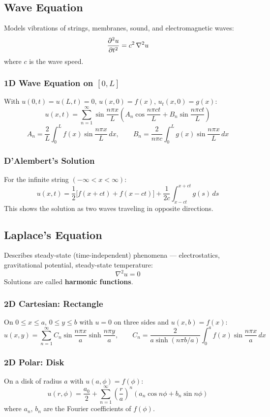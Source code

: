 \documentclass[11pt, letterpaper]{article}
\theoremstyle{plain}
\begin{document}
\subsection{Wave Equation}

Models vibrations of strings, membranes, sound, and electromagnetic waves:
\[
    \pdv[2]{u}{t} = c^2\,\nabla^2 u
\]
where $c$ is the wave speed.

\subsubsection*{1D Wave Equation on $[0,L]$}
With $u(0,t) = u(L,t) = 0$, $u(x,0) = f(x)$, $u_t(x,0) = g(x)$:
\[
    u(x,t) = \sum_{n=1}^{\infty} \sin\frac{n\pi x}{L}
    \left(A_n\cos\frac{n\pi ct}{L} + B_n\sin\frac{n\pi ct}{L}\right)
\]
\[
    A_n = \frac{2}{L}\int_0^L f(x)\sin\frac{n\pi x}{L}\,dx, \qquad
    B_n = \frac{2}{n\pi c}\int_0^L g(x)\sin\frac{n\pi x}{L}\,dx
\]

\subsubsection*{D'Alembert's Solution}
For the infinite string $(-\infty < x < \infty)$:
\[
    u(x,t) = \frac{1}{2}\bigl[f(x+ct) + f(x-ct)\bigr]
            + \frac{1}{2c}\int_{x-ct}^{x+ct} g(s)\,ds
\]
This shows the solution as two waves traveling in opposite directions.


\subsection{Laplace's Equation}

Describes steady-state (time-independent) phenomena — electrostatics,
gravitational potential, steady-state temperature:
\[
    \nabla^2 u = 0
\]
Solutions are called \textbf{harmonic functions}.

\subsubsection*{2D Cartesian: Rectangle}
On $0\leq x\leq a$, $0\leq y\leq b$ with $u=0$ on three sides and
$u(x,b) = f(x)$:
\[
    u(x,y) = \sum_{n=1}^{\infty} C_n \sin\frac{n\pi x}{a}
              \sinh\frac{n\pi y}{a}, \qquad
    C_n = \frac{2}{a\sinh(n\pi b/a)}\int_0^a f(x)\sin\frac{n\pi x}{a}\,dx
\]

\subsubsection*{2D Polar: Disk}
On a disk of radius $a$ with $u(a,\phi) = f(\phi)$:
\[
    u(r,\phi) = \frac{a_0}{2} + \sum_{n=1}^{\infty}
    \left(\frac{r}{a}\right)^n (a_n\cos n\phi + b_n\sin n\phi)
\]
where $a_n$, $b_n$ are the Fourier coefficients of $f(\phi)$.
\end{document}
